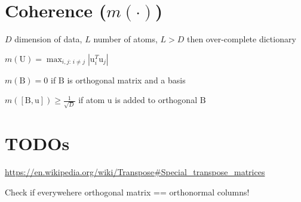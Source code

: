 \documentclass[a4paper, 11pt, landscape]{article}
\newcommand{\matr}[1]{\boldsymbol{\mathrm{#1}}}
\begin{document}
\begin{multicols*}{3}
\section{Coherence ($m(\cdot)$)}
\begin{compactitem}
	\item $D$ dimension of data, $L$ number of atoms, $L > D$ then over-complete dictionary
	\item $m(\matr{U}) = \max_{i,j:\, i \neq j} | \matr{u}_i^T \matr{u}_j |$
	\item $m(\matr{B}) = 0$ if $\matr{B}$ is orthogonal matrix and a basis
	\item $m([\matr{B}, \matr{u}]) \geq \frac{1}{\sqrt{D}}$ if atom $\matr{u}$ is added to orthogonal $\matr{B}$
\end{compactitem}


\section{TODOs}
\url{https://en.wikipedia.org/wiki/Transpose#Special_transpose_matrices}

Check if everywehere orthogonal matrix == orthonormal columns!



\raggedcolumns
\end{multicols*}
\end{document}
